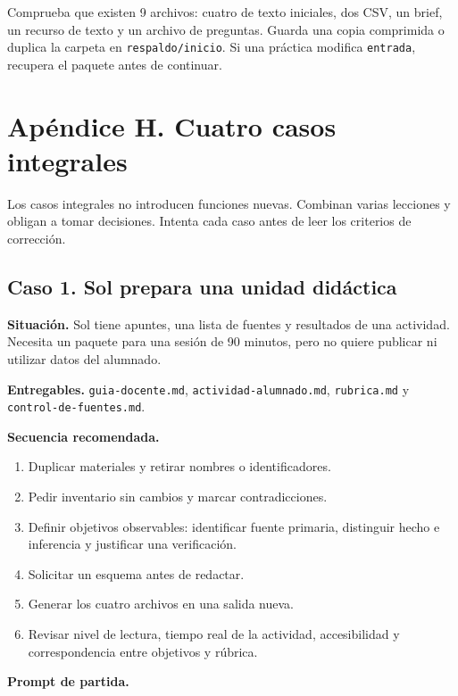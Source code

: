 \documentclass[10pt,a4paper,openany]{book}
\providecommand{\tightlist}{\setlength{\itemsep}{0.18em}\setlength{\parskip}{0pt}}
\begin{document}
Comprueba que existen 9 archivos: cuatro de texto iniciales, dos CSV, un
brief, un recurso de texto y un archivo de preguntas. Guarda una copia
comprimida o duplica la carpeta en \texttt{respaldo/inicio}. Si una
práctica modifica \texttt{entrada}, recupera el paquete antes de
continuar.

\chapter{Apéndice H. Cuatro casos
integrales}\label{apuxe9ndice-h.-cuatro-casos-integrales}

Los casos integrales no introducen funciones nuevas. Combinan varias
lecciones y obligan a tomar decisiones. Intenta cada caso antes de leer
los criterios de corrección.

\section{Caso 1. Sol prepara una unidad
didáctica}\label{caso-1.-sol-prepara-una-unidad-diduxe1ctica}

\textbf{Situación.} Sol tiene apuntes, una lista de fuentes y resultados
de una actividad. Necesita un paquete para una sesión de 90 minutos,
pero no quiere publicar ni utilizar datos del alumnado.

\textbf{Entregables.} \texttt{guia-docente.md},
\texttt{actividad-alumnado.md}, \texttt{rubrica.md} y
\texttt{control-de-fuentes.md}.

\textbf{Secuencia recomendada.}

\begin{enumerate}
\def\labelenumi{\arabic{enumi}.}
\tightlist
\item
  Duplicar materiales y retirar nombres o identificadores.
\item
  Pedir inventario sin cambios y marcar contradicciones.
\item
  Definir objetivos observables: identificar fuente primaria, distinguir
  hecho e inferencia y justificar una verificación.
\item
  Solicitar un esquema antes de redactar.
\item
  Generar los cuatro archivos en una salida nueva.
\item
  Revisar nivel de lectura, tiempo real de la actividad, accesibilidad y
  correspondencia entre objetivos y rúbrica.
\end{enumerate}

\textbf{Prompt de partida.}
\end{document}
